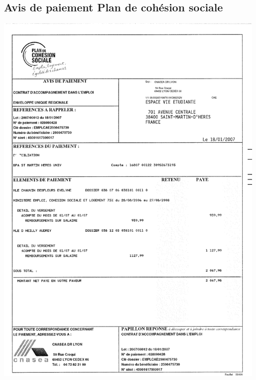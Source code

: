 \subsection{Avis de paiement Plan de cohésion sociale}
\begin{center}
\includegraphics[scale=0.7]{annexes/images/bonne_question.pdf}
\end{center}
